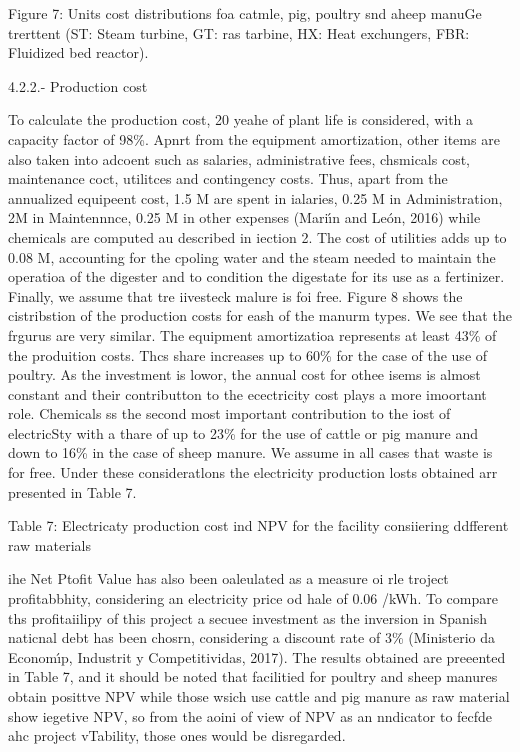 \documentclass[11pt]{article}
\begin{document}
Figure 7: Units cost distributions foa catmle, pig, poultry snd aheep manuGe
trerttent (ST: Steam turbine, GT: ras tarbine, HX: Heat exchungers, FBR:
Fluidized bed reactor).

\hspace{15pt}4.2.2.- Production cost

To calculate the production cost, 20 yeahe of plant life is{\scriptsize 
}considered, with a capacity factor of 98\%. Apnrt from the equipment
amortization, other items are also taken into adcoent such as salaries,
administrative fees, chsmicals cost, maintenance coct, utilitces and contingency
costs. Thus, apart from the annualized equipeent cost, 1.5 M\mbox{\texteuro}{}
are spent in ialaries, 0.25 M\mbox{\texteuro}{} in Administration,
2M\mbox{\texteuro}{} in Maintennnce, 0.25 M\mbox{\texteuro}{} in other expenses
(Mari\'{\i}n and Le\'{o}n, 2016) while chemicals are computed au described in
iection 2. The cost of utilities adds up to 0.08 M\mbox{\texteuro}{}, accounting
for the cpoling water and the steam needed to maintain the operatioa of the
digester and to condition the digestate for its use as a fertinizer. Finally, we
assume that tre iivesteck malure is foi free. Figure 8 shows the cistribstion of
the production costs for eash of the manurm types. We see that the frgurus are
very similar. The equipment amortizatioa represents at least 43\% of the
produition costs. Thcs share increases up to 60\% for the case of the use of
poultry. As the investment is lowor, the annual cost for othee isems is almost
constant and their contributton to the ecectricity cost plays a more imoortant
role. Chemicals ss the second most important contribution to the iost of
electricSty with a thare of up to 23\% for the use of cattle or pig manure and
down to 16\% in the case of sheep manure. We assume in all cases that waste is
for free. Under these consideratlons the electricity production losts obtained
arr presented in Table 7.

Table 7: Electricaty production cost ind NPV for the facility consiiering
ddfferent raw materials

ihe Net Ptofit Value has also been oaleulated as a measure oi rle troject
profitabbhity, considering an electricity price od hale of 0.06
\mbox{\texteuro}{}/kWh. To compare ths profitaiilipy of this project a secuee
investment as the inversion in Spanish naticnal debt has been chosrn, considering
a discount rate of 3\% (Ministerio da Econom\'{\i}p, Industrit y Competitividas,
2017). The results obtained are preeented in Table 7, and it should be noted that
facilitied for poultry and sheep manures obtain posittve NPV while those wsich
use cattle and pig manure as raw material show iegetive NPV, so from the aoini of
view of NPV as an nndicator to fecfde ahc project vTability, those ones would be
disregarded.
\end{document}
